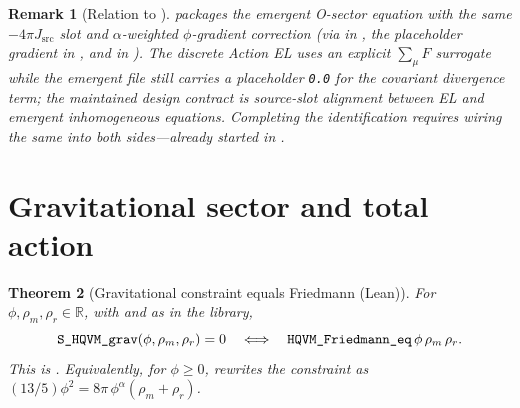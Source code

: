 \documentclass[11pt]{amsart}
\newtheorem{theorem}{Theorem}[section]
\newtheorem{remark}[theorem]{Remark}
\begin{document}
\begin{remark}[Relation to ]
\label{rem:modified-maxwell}
 packages the emergent O-sector equation with the same \(-4\pi J_{\mathrm{src}}\) slot and \(\alpha\)-weighted \(\phi\)-gradient correction (via  in , the placeholder gradient in , and  in ). The discrete Action EL uses an explicit \(\sum_\mu F\) surrogate while the emergent file still carries a placeholder \texttt{0.0} for the covariant divergence term; the maintained design contract is \emph{source-slot alignment} between EL and emergent inhomogeneous equations. Completing the identification requires wiring the same  into both sides---already started in .
\end{remark}

\section{Gravitational sector and total action}
\label{sec:grav}

\begin{theorem}[Gravitational constraint equals Friedmann (Lean)]
\label{thm:friedmann}
For \(\phi,\rho_m,\rho_r\in\mathbb{R}\), with  and  as in the library,
\[
\text{\texttt{S\_HQVM\_grav}}(\phi,\rho_m,\rho_r)=0
\quad\Longleftrightarrow\quad
\text{\texttt{HQVM\_Friedmann\_eq}}\,\phi\,\rho_m\,\rho_r.
\]
This is . Equivalently, for \(\phi\ge 0\),  rewrites the constraint as \((13/5)\phi^2 = 8\pi\,\phi^{\alpha}(\rho_m+\rho_r)\).
\end{theorem}
\end{document}
